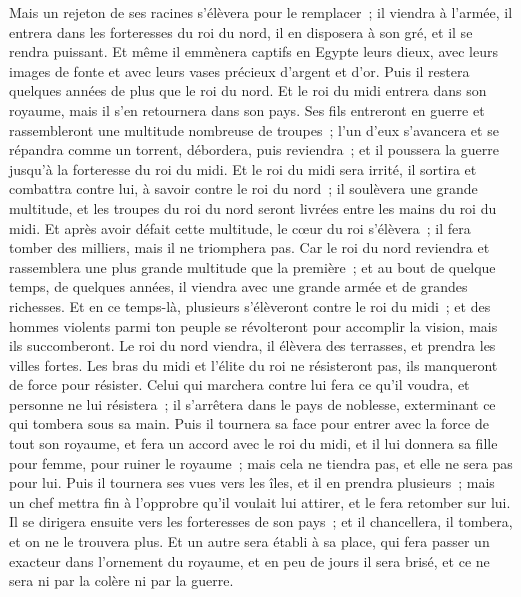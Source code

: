 \begin{multicols}{2}
Mais un rejeton de ses racines s'élèvera pour le remplacer~; il viendra à l'armée, il entrera dans les forteresses du roi du nord, il en disposera à son gré, et il se rendra puissant.
Et même il emmènera captifs en Egypte leurs dieux, avec leurs images de fonte et avec leurs vases précieux d'argent et d'or. Puis il restera quelques années de plus que le roi du nord.
Et le roi du midi entrera dans son royaume, mais il s'en retournera dans son pays.
Ses fils entreront en guerre et rassembleront une multitude nombreuse de troupes~; l'un d'eux s'avancera et se répandra comme un torrent, débordera, puis reviendra~; et il poussera la guerre jusqu'à la forteresse du roi du midi.
Et le roi du midi sera irrité, il sortira et combattra contre lui, à savoir contre le roi du nord~; il soulèvera une grande multitude, et les troupes du roi du nord seront livrées entre les mains du roi du midi.
Et après avoir défait cette multitude, le cœur du roi s'élèvera~; il fera tomber des milliers, mais il ne triomphera pas.
Car le roi du nord reviendra et rassemblera une plus grande multitude que la première~; et au bout de quelque temps, de quelques années, il viendra avec une grande armée et de grandes richesses.
Et en ce temps-là, plusieurs s'élèveront contre le roi du midi~; et des hommes violents parmi ton peuple se révolteront pour accomplir la vision, mais ils succomberont.
Le roi du nord viendra, il élèvera des terrasses, et prendra les villes fortes. Les bras du midi et l'élite du roi ne résisteront pas, ils manqueront de force pour résister.
Celui qui marchera contre lui fera ce qu'il voudra, et personne ne lui résistera~; il s'arrêtera dans le pays de noblesse, exterminant ce qui tombera sous sa main.
Puis il tournera sa face pour entrer avec la force de tout son royaume, et fera un accord avec le roi du midi, et il lui donnera sa fille pour femme, pour ruiner le royaume~; mais cela ne tiendra pas, et elle ne sera pas pour lui.
Puis il tournera ses vues vers les îles, et il en prendra plusieurs~; mais un chef mettra fin à l'opprobre qu'il voulait lui attirer, et le fera retomber sur lui.
Il se dirigera ensuite vers les forteresses de son pays~; et il chancellera, il tombera, et on ne le trouvera plus.
Et un autre sera établi à sa place, qui fera passer un exacteur dans l'ornement du royaume, et en peu de jours il sera brisé, et ce ne sera ni par la colère ni par la guerre.

\end{multicols}
